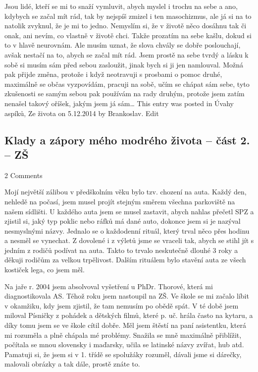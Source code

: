 \documentclass[DIV=calc, paper=a4, fontsize=11pt, twocolumn]{scrartcl}	 %
\begin{document}
Jsou lidé, kteří se mi to snaží vymluvit, abych myslel i trochu na
sebe a ano, kdybych se začal mít rád, tak by nejspíš zmizel i ten
masochizmus, ale já si na to natolik zvyknul, že je mi to
jedno. Nemyslím si, že v životě něco dosáhnu tak či onak, ani nevím,
co vlastně v životě chci. Takže prozatím na sebe kašlu, dokud si to v
hlavě neurovnám. Ale musím uznat, že slova chvály se dobře
poslouchají, avšak nestačí na to, abych se začal mít rád. Jsem prostě
na sebe tvrdý a lásku k sobě si musím sám před sebou zasloužit, jinak
bych si ji jen namlouval. Možná pak přijde změna, protože i když
neotravuji s prosbami o pomoc druhé, maximálně se občas vyzpovídám,
pracuji na sobě, učím se chápat sám sebe, tyto zkušenosti se samým
sebou pak používám na rady druhým, protože jsem zatím nenašel takový
oříšek, jakým jsem já sám…
This entry was posted in Úvahy aspíků, Ze života on 5.12.2014 by
Brankoslav. Edit
\subsection*{Klady a zápory mého modrého života – část 2. – ZŠ}
2 Comments

Mojí největší zálibou v předškolním věku bylo tzv. chození na
auta. Každý den, nehledě na počasí, jsem musel projít stejným směrem
všechna parkoviště na našem sídlišti. U každého auta jsem se musel
zastavit, abych nahlas přečetl SPZ a zjistil si, jaký typ poklic nebo
ráfků má dané auto, dokonce jsem si je nazýval nesmyslnými názvy.
Jednalo se o každodenní rituál, který trval něco přes hodinu a nesměl
se vynechat. Z dovolené i z výletů jsme se vraceli tak, abych se stihl
jít s jedním z rodičů podívat na auta. Takto to trvalo neskutečně
dlouhé 3 roky a děkuji rodičům za velkou trpělivost. Dalším rituálem
bylo stavění auta ze všech kostiček lega, co jsem měl.

Na jaře r. 2004 jsem absolvoval vyšetření u PhDr. Thorové, která mi
diagnostikovala AS. Téhož roku jsem nastoupil na ZŠ. Ve škole se mi
začalo líbit v okamžiku, kdy jsem zjistil, že tam nemusím po obědě
spát. V té době jsem miloval Písničky z pohádek a dětských filmů,
které p. uč. hrála často na kytaru, a díky tomu jsem se ve škole cítil
dobře. Měl jsem štěstí na paní asistentku, která mi rozuměla a plně
chápala mé problémy. Snažila se mně maximálně přiblížit, počítala se
mnou slovensky i maďarsky, učila se latinské názvy zvířat, hub
atd. Pamatuji si, že jsem si v 1. třídě se spolužáky rozuměl, dávali
jsme si dárečky, malovali obrázky a tak dále, prostě znáte to.
\end{document}
